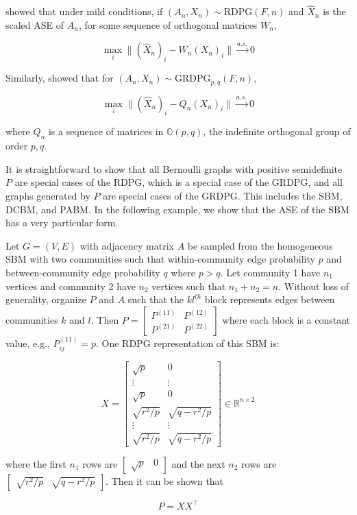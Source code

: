 \documentclass[
  11pt,
]{article}
\begin{document}
\citet{athreya2017statistical} showed that under mild conditions, if
\((A_n, X_n) \sim \text{RDPG}(F, n)\) and \(\hat{X}_n\) is the scaled
ASE of \(A_n\), for some sequence of orthogonal matrices \(W_n\),

\begin{equation}
\max_i \|(\hat{X}_n)_i - W_n (X_n)_i \| \stackrel{a.s.}{\to} 0
\end{equation}

Similarly, \citet{rubindelanchy2017statistical} showed that for
\((A_n, X_n) \sim \text{GRDPG}_{p, q}(F, n)\),

\begin{equation}
\max_i \|(\hat{X}_n)_i - Q_n (X_n)_i \| \stackrel{a.s.}{\to} 0
\end{equation}

where \(Q_n\) is a sequence of matrices in \(\mathbb{O}(p, q)\), the
indefinite orthogonal group of order \(p, q\).

It is straightforward to show that all Bernoulli graphs with positive
semidefinite \(P\) are special cases of the RDPG, which is a special
case of the GRDPG, and all graphs generated by \(P\) are special cases
of the GRDPG. This includes the SBM, DCBM, and PABM. In the following
example, we show that the ASE of the SBM has a very particular form.

\begin{example}
Let $G = (V, E)$ with adjacency matrix $A$ be sampled from the homogeneous SBM with two communities such that within-community edge probability $p$ and between-community edge probability $q$ where $p > q$. Let community 1 have $n_1$ vertices and community 2 have $n_2$ vertices such that $n_1 + n_2 = n$. Without loss of generality, organize $P$ and $A$ such that the $kl^{th}$ block represents edges between communities $k$ and $l$. Then $P = \begin{bmatrix} P^{(11)} & P^{(12)} \\ P^{(21)} & P^{(22)} \end{bmatrix}$ where each block is a constant value, e.g., $P^{(11)}_{ij} = p$. One RDPG representation of this SBM is:

$$X = \begin{bmatrix} 
\sqrt{p} & 0 \\
\vdots & \vdots \\
\sqrt{p} & 0 \\
\sqrt{r^2 / p} & \sqrt{q - r^2 / p} \\ 
\vdots & \vdots \\
\sqrt{r^2 / p} & \sqrt{q - r^2 / p}
\end{bmatrix}
\in \mathbb{R}^{n \times 2}$$

where the first $n_1$ rows are $\begin{bmatrix} \sqrt{p} & 0 \end{bmatrix}$ and the next $n_2$ rows are $\begin{bmatrix} \sqrt{r^2 / p} & \sqrt{q - r^2 / p} \end{bmatrix}$. Then it can be shown that 

$$P = X X^\top$$
\end{example}
\end{document}
